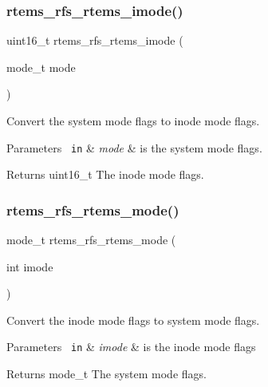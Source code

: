 \subsubsection{\texorpdfstring{rtems\_rfs\_rtems\_imode()}{rtems\_rfs\_rtems\_imode()}}
{\footnotesize\ttfamily uint16\+\_\+t rtems\+\_\+rfs\+\_\+rtems\+\_\+imode (\begin{DoxyParamCaption}\item[{mode\+\_\+t}]{mode }\end{DoxyParamCaption})}

Convert the system mode flags to inode mode flags.


\begin{DoxyParams}[1]{Parameters}
\mbox{\texttt{ in}}  & {\em mode} & is the system mode flags. \\
\hline
\end{DoxyParams}
\begin{DoxyReturn}{Returns}
uint16\+\_\+t The inode mode flags. 
\end{DoxyReturn}
\mbox{\label{rtems-rfs-rtems-utils_8c_aff5423998d0f78a1caecd4acff199690}} 
\subsubsection{\texorpdfstring{rtems\_rfs\_rtems\_mode()}{rtems\_rfs\_rtems\_mode()}}
{\footnotesize\ttfamily mode\+\_\+t rtems\+\_\+rfs\+\_\+rtems\+\_\+mode (\begin{DoxyParamCaption}\item[{int}]{imode }\end{DoxyParamCaption})}

Convert the inode mode flags to system mode flags.


\begin{DoxyParams}[1]{Parameters}
\mbox{\texttt{ in}}  & {\em imode} & is the inode mode flags \\
\hline
\end{DoxyParams}
\begin{DoxyReturn}{Returns}
mode\+\_\+t The system mode flags. 
\end{DoxyReturn}
\mbox{\label{rtems-rfs-rtems-utils_8c_a259ad09e94606e05bbc93775420ba21f}} 
